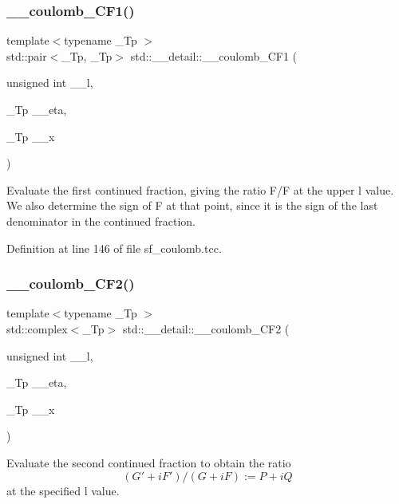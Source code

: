 \subsubsection{\texorpdfstring{\+\_\+\+\_\+coulomb\+\_\+\+C\+F1()}{\_\_coulomb\_CF1()}}
{\footnotesize\ttfamily template$<$typename \+\_\+\+Tp $>$ \\
std\+::pair$<$\+\_\+\+Tp, \+\_\+\+Tp$>$ std\+::\+\_\+\+\_\+detail\+::\+\_\+\+\_\+coulomb\+\_\+\+C\+F1 (\begin{DoxyParamCaption}\item[{unsigned int}]{\+\_\+\+\_\+l,  }\item[{\+\_\+\+Tp}]{\+\_\+\+\_\+eta,  }\item[{\+\_\+\+Tp}]{\+\_\+\+\_\+x }\end{DoxyParamCaption})}

Evaluate the first continued fraction, giving the ratio F\textquotesingle{}/F at the upper l value. We also determine the sign of F at that point, since it is the sign of the last denominator in the continued fraction. 

Definition at line 146 of file sf\+\_\+coulomb.\+tcc.

\mbox{\label{namespacestd_1_1____detail_a400332397b6d529764b61bdd7726f75c}} 
\subsubsection{\texorpdfstring{\+\_\+\+\_\+coulomb\+\_\+\+C\+F2()}{\_\_coulomb\_CF2()}}
{\footnotesize\ttfamily template$<$typename \+\_\+\+Tp $>$ \\
std\+::complex$<$\+\_\+\+Tp$>$ std\+::\+\_\+\+\_\+detail\+::\+\_\+\+\_\+coulomb\+\_\+\+C\+F2 (\begin{DoxyParamCaption}\item[{unsigned int}]{\+\_\+\+\_\+l,  }\item[{\+\_\+\+Tp}]{\+\_\+\+\_\+eta,  }\item[{\+\_\+\+Tp}]{\+\_\+\+\_\+x }\end{DoxyParamCaption})}

Evaluate the second continued fraction to obtain the ratio \[ (G' + i F') / (G + i F) := P + i Q \] at the specified l value. 

